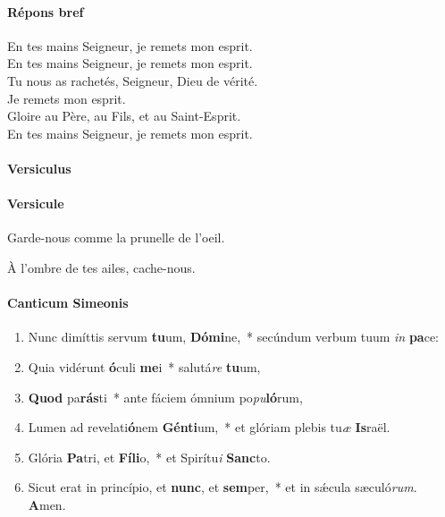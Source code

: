 \documentclass[twoside]{article}
\begin{document}
\begin{paracol}[1]{2}
\pagebreak

\paragraph{Répons bref}

\rr En tes mains Seigneur, je remets mon esprit.\\
\rr En tes mains Seigneur, je remets mon esprit.\\
\vv Tu nous as rachetés, Seigneur, Dieu de vérité.\\
\GreSpecial{*} Je remets mon esprit.\\
\vv Gloire au Père, au Fils, et au Saint-Esprit.\\
\rr En tes mains Seigneur, je remets mon esprit.\\

\switchcolumn*

\paragraph{Versiculus}


\pagebreak

\switchcolumn

\paragraph{Versicule}

\vv Garde-nous comme la prunelle de l'oeil.

\rr À l'ombre de tes ailes, cache-nous.

\pagebreak

\switchcolumn*

\paragraph{Canticum Simeonis}


\begin{enumerate}[wide, itemsep=0mm, labelwidth=!, labelindent=0pt, label=\color{gregoriocolor}\theenumi]
\item Nunc dimíttis \cc servum \textbf{tu}um, \textbf{Dó}\textbf{mi}ne,~* secúndum verbum tuum \textit{in} \textbf{pa}ce:
\item Quia vidérunt \textbf{ó}culi \textbf{me}i~* salutá\textit{re} \textbf{tu}um,
\item \textbf{Quod} pa\textbf{rás}ti~* ante fáciem ómnium po\textit{pu}\textbf{ló}rum,
\item Lumen ad revelati\textbf{ó}nem \textbf{Gén}\textbf{ti}um,~* et glóriam plebis tu\textit{æ} \textbf{Is}raël.
\item Glória \textbf{Pa}tri, et \textbf{Fí}\textbf{li}o,~* et Spirítu\textit{i} \textbf{Sanc}to.
\item Sicut erat in princípio, et \textbf{nunc}, et \textbf{sem}per,~* et in sǽcula sæculó\textit{rum}. \textbf{A}men.
\end{enumerate}


\end{paracol}
\end{document}
